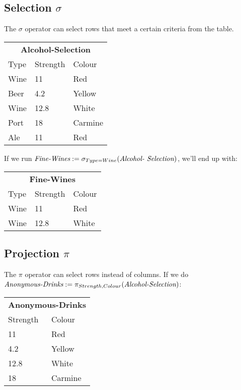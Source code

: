 \subsection{Selection $\sigma$}

The $\sigma$ operator can select rows that meet a certain criteria from the
table.

\begin{center}
  \begin{tabular}{lll}
    \multicolumn{3}{c}{\textbf{Alcohol-Selection}}\\
    {Type} & {Strength} & {Colour}\\ \hline
    Wine          & 11                & Red\\
    Beer          & 4.2               & Yellow\\
    Wine          & 12.8              & White\\
    Port          & 18                & Carmine\\
    Ale           & 11                & Red\\
  \end{tabular}
\end{center}

If we run $\text{\it Fine-Wines}:=\sigma_{Type=Wine}(\text{\it Alcohol-
Selection})$, we'll end up with:

\begin{center}
  \begin{tabular}{lll}
    \multicolumn{3}{c}{\textbf{Fine-Wines}}\\
    {Type} & {Strength} & {Colour}\\ \hline
    Wine          & 11                & Red\\
    Wine          & 12.8              & White\\
  \end{tabular}
\end{center}

\subsection{Projection $\pi$}

The $\pi$ operator can select rows instead of columns. If we do $\text{\it
Anonymous-Drinks} := \pi_{Strength, Colour}(\text{\it Alcohol-Selection})$:

\begin{center}
  \begin{tabular}{ll}
    \multicolumn{2}{c}{\textbf{Anonymous-Drinks}}\\
    {Strength} & {Colour}\\ \hline
    11         & Red\\
    4.2        & Yellow\\
    12.8       & White\\
    18         & Carmine\\
  \end{tabular}
\end{center}

